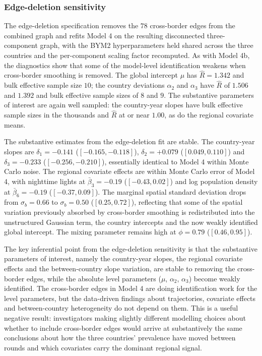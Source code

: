 \documentclass{article}
\begin{document}
\subsubsection{Edge-deletion
sensitivity}\label{edge-deletion-sensitivity}

The edge-deletion specification removes the \(78\) cross-border edges
from the combined graph and refits Model 4 on the resulting disconnected
three-component graph, with the BYM2 hyperparameters held shared across
the three countries and the per-component scaling factor recomputed. As
with Model 4b, the diagnostics show that some of the model-level
identification weakens when cross-border smoothing is removed. The
global intercept \(\mu\) has \(\hat{R} = 1.342\) and bulk effective
sample size \(10\); the country deviations \(\alpha_2\) and \(\alpha_3\)
have \(\hat{R}\) of \(1.506\) and \(1.392\) and bulk effective sample
sizes of \(8\) and \(9\). The substantive parameters of interest are
again well sampled: the country-year slopes have bulk effective sample
sizes in the thousands and \(\hat{R}\) at or near \(1.00\), as do the
regional covariate means.

The substantive estimates from the edge-deletion fit are stable. The
country-year slopes are \(\delta_1 = -0.141\) (\([-0.165, -0.118]\)),
\(\delta_2 = +0.079\) (\([0.049, 0.110]\)) and \(\delta_3 = -0.233\)
(\([-0.256, -0.210]\)), essentially identical to Model 4 within Monte
Carlo noise. The regional covariate effects are within Monte Carlo error
of Model 4, with nighttime lights at \(\bar{\beta}_3 = -0.19\)
(\([-0.43, 0.02]\)) and log population density at
\(\bar{\beta}_6 = -0.19\) (\([-0.37, 0.09]\)). The marginal spatial
standard deviation drops from \(\sigma_b = 0.66\) to \(\sigma_b = 0.50\)
(\([0.25, 0.72]\)), reflecting that some of the spatial variation
previously absorbed by cross-border smoothing is redistributed into the
unstructured Gaussian term, the country intercepts and the now weakly
identified global intercept. The mixing parameter remains high at
\(\phi = 0.79\) (\([0.46, 0.95]\)).

The key inferential point from the edge-deletion sensitivity is that the
substantive parameters of interest, namely the country-year slopes, the
regional covariate effects and the between-country slope variation, are
stable to removing the cross-border edges, while the absolute level
parameters (\(\mu\), \(\alpha_2\), \(\alpha_3\)) become weakly
identified. The cross-border edges in Model 4 are doing identification
work for the level parameters, but the data-driven findings about
trajectories, covariate effects and between-country heterogeneity do not
depend on them. This is a useful negative result: investigators making
slightly different modelling choices about whether to include
cross-border edges would arrive at substantively the same conclusions
about how the three countries' prevalence have moved between rounds and
which covariates carry the dominant regional signal.
\end{document}
